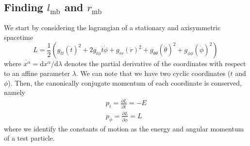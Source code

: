 \documentclass[twocolumn,aps,showpacs,showkeys,prd,superscriptaddress,byrevtex, amsmath]{revtex4-1}
\begin{document}
\begin{appendix}

\section{Finding $l_{\mathrm{mb}}$ and $r_{\mathrm{mb}}$}\label{ang_mom_appendix}
We start by considering the lagrangian of a stationary and axisymmetric spacetime
\begin{equation}
L = \frac{1}{2}\left(g_{tt} (\dot{t})^2 + 2 g_{t\phi} \dot{t}\dot{\phi} + g_{rr} (\dot{r})^2 + g_{\theta\theta} (\dot{\theta})^2 + g_{\phi\phi} (\dot{\phi})^2\right)\,
\end{equation}
where $\dot{x^{\alpha}} = \mathrm{d}x^{\alpha}/\mathrm{d}\lambda$ denotes the partial derivative of the coordinates with respect to an affine parameter $\lambda$. We can note that we have two cyclic coordinates ($t$ and $\phi$). Then, the canonically conjugate momentum of each coordinate is conserved, namely
\begin{eqnarray}\label{eq:momenta}
p_t = \frac{\partial L}{\partial \dot{t}} = -E
\\
p_{\phi} = \frac{\partial L}{\partial \dot{\phi}} = L\,
\end{eqnarray}
where we identify the constants of motion as the energy and angular momentum of a test particle.


\end{appendix}
\end{document}

